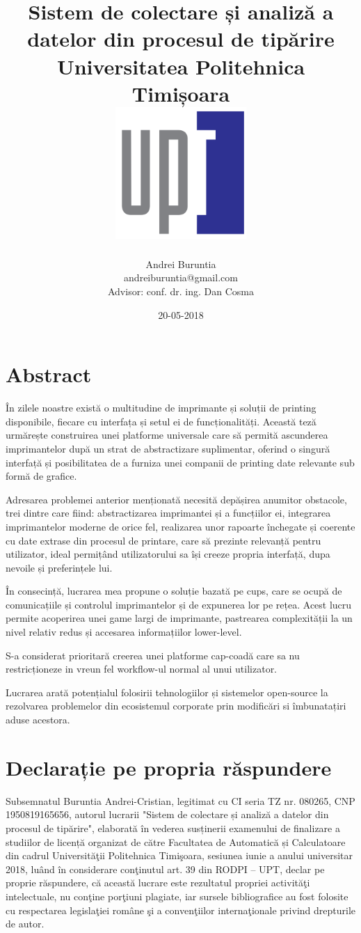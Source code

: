 \documentclass[a4paper, 12pt, twoside]{report}
\title{
	{Sistem de colectare și analiză a datelor din procesul de tipărire}\\
	{\large Universitatea Politehnica Timișoara}\\
	{\includegraphics[width=50mm]{upt_logo.png}}
}
\author{Andrei Buruntia \\ andreiburuntia@gmail.com\\[1cm]{ Advisor: conf. dr. ing. Dan Cosma}}
\date{20-05-2018}
\begin{document}
\maketitle

\newpage\null\thispagestyle{empty}\newpage

\chapter*{Abstract}
În zilele noastre există o multitudine de imprimante și soluții de printing disponibile, fiecare cu interfața și setul ei de funcționalități. Această teză urmărește construirea unei platforme universale care să permită ascunderea imprimantelor după un strat de abstractizare suplimentar, oferind o singură interfață și posibilitatea de a furniza unei companii de printing date relevante sub formă de grafice.

Adresarea problemei anterior menționată necesită depășirea anumitor obstacole, trei dintre care fiind: abstractizarea imprimantei și a funcțiilor ei, integrarea imprimantelor moderne de orice fel, realizarea unor rapoarte închegate și coerente cu date extrase din procesul de printare, care să prezinte relevanță pentru utilizator, ideal permițând utilizatorului sa își creeze propria interfață, dupa nevoile și preferințele lui.

În consecință, lucrarea mea propune o soluție bazată pe \acrshort{cups}, care se ocupă de comunicațiile și controlul imprimantelor și de expunerea lor pe rețea. Acest lucru permite acoperirea unei game largi de imprimante, pastrearea complexității la un nivel relativ redus și accesarea informațiilor lower-level.

S-a considerat prioritară creerea unei platforme cap-coadă care sa nu restricționeze in vreun fel workflow-ul normal al unui utilizator.

Lucrarea arată potențialul folosirii tehnologiilor și sistemelor open-source la rezolvarea problemelor din ecosistemul corporate prin modificări si îmbunatațiri aduse acestora.

\newpage\null\thispagestyle{empty}\newpage

\chapter*{Declarație pe propria răspundere}
Subsemnatul Buruntia Andrei-Cristian, legitimat cu CI seria TZ nr. 080265, CNP 1950819165656, autorul lucrarii "Sistem de colectare și analiză a datelor din procesul de tipărire", elaborată în vederea susținerii examenului de finalizare a studiilor de licență organizat de către Facultatea de Automatică și Calculatoare din cadrul Universităţii Politehnica Timişoara, sesiunea iunie a anului universitar 2018, luând în considerare conţinutul art. 39 din RODPI – UPT, declar pe proprie răspundere, că această lucrare este rezultatul propriei activităţi intelectuale, nu conţine porţiuni plagiate, iar sursele bibliografice au fost folosite cu respectarea legislaţiei române şi a convenţiilor internaţionale privind drepturile de autor.
\end{document}

